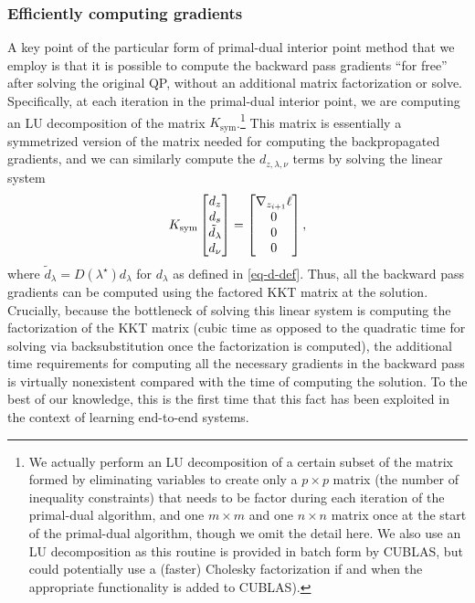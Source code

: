 \subsubsection{Efficiently computing gradients}
\label{sec:optnet:qp-solver-grads}
A key point of the particular form of primal-dual interior point method that we
employ is that it is possible to compute the backward pass gradients ``for
free'' after solving the original QP, without an additional matrix factorization
or solve.  Specifically, at each iteration in the primal-dual interior point, we
are computing an LU decomposition of the matrix $K_{\mathrm{sym}}$.\footnote{We
    actually perform an LU decomposition of a certain subset of the matrix formed
    by eliminating variables to create only a $p \times p$ matrix (the number of
    inequality constraints) that needs to be factor during each iteration of the
    primal-dual algorithm, and one $m \times m$ and one $n \times n$ matrix once at
    the start of the primal-dual algorithm, though we omit the detail here.  We also
    use an LU decomposition as this routine is provided in batch form by CUBLAS, but
    could potentially use a (faster) Cholesky factorization if and when the
    appropriate functionality is added to CUBLAS).}  This matrix is essentially a
symmetrized version of the matrix needed for computing the backpropagated
gradients, and we can similarly compute the $d_{z,\lambda,\nu}$ terms by solving
the linear system
\begin{equation}
    K_{\rm sym}
    \begin{bmatrix}
        d_z               \\
        d_s               \\
        \tilde{d}_\lambda \\
        d_\nu             \\
    \end{bmatrix}
    =
    \begin{bmatrix}
        \nabla_{z_{i+1}} \ell \\
        0                     \\
        0                     \\
        0                     \\
    \end{bmatrix},
    \label{eq:grads-system}
\end{equation}
where $\tilde{d}_\lambda = D(\lambda^\star) d_\lambda$ for $d_\lambda$ as
defined in \eqref{eq-d-def}.  Thus, all the backward pass gradients can be computed
using the factored KKT matrix at the solution.  Crucially, because the
bottleneck of solving this linear system is computing the factorization of the
KKT matrix (cubic time as opposed to the quadratic time for solving via
backsubstitution once the factorization is computed), the additional time
requirements for computing all the necessary gradients in the backward pass is
virtually nonexistent compared with the time of computing the solution.  To the
best of our knowledge, this is the first time that this fact has been exploited
in the context of learning end-to-end systems.

